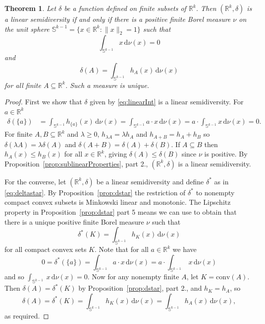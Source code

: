 \documentclass[11pt]{article}
\newtheorem{theorem}{Theorem}
\newcommand{\bbS}{\mathbb{S}}
\newcommand{\conv}{\mathrm{conv}}
\renewcommand{\Re}{\mathbb{R}}
\begin{document}
\begin{theorem}\label{thm:linear_characterize}
Let $\delta$ be a function defined on finite subsets of $\Re^k$. Then $(\Re^k,\delta)$ is a linear semidiversity if and only if there is a positive finite Borel measure $\nu$ on the unit sphere $\bbS^{k-1} = \{x \in \Re^k: \|x\|_2 = 1\}$  such that 
\begin{equation} \label{eq:centroid}
    \int_{\bbS^{k-1}} x \, \mathrm{d}\nu(x) = 0
\end{equation} 
and
\begin{equation} 
\delta(A) = \int_{\bbS^{k-1}} h_A(x) \, \mathrm{d}\nu(x) \label{eq:linearInt} \end{equation}
for all finite $A \subseteq \Re^k$. Such a measure is unique.
\end{theorem}
\begin{proof}
First we show that $\delta$ given by \eqref{eq:linearInt} is a linear semidiversity. For $a \in \Re^k$
\begin{align*}
\delta(\{a\}) & = \int_{\bbS^{k-1}} h_{\{a\}}(x) \, \mathrm{d}\nu(x) 
 = \int_{\bbS^{k-1}} a \cdot x \,  \mathrm{d}\nu(x) 
 = a \cdot \int_{\bbS^{k-1}}  x \, \mathrm{d}\nu(x) 
 = 0.
\end{align*}
For finite $A,B \subseteq \Re^k$ and $\lambda \geq 0$, $h_{\lambda A}=\lambda h_A$ and $h_{A+B} = h_A+h_B$ so $\delta(\lambda A)= \lambda \delta(A)$ and  $\delta(A+B) = \delta(A) + \delta(B)$. If $A \subseteq B$ then  $h_A(x) \leq h_B(x)$ for all $x \in \Re^k$, giving $\delta(A) \leq \delta(B)$ since $\nu$ is positive. By Proposition~\ref{prop:sublinearProperties}, part 2., 
$(\Re^k,\delta)$ is a linear semidiversity.

For the converse, let $(\Re^k,\delta)$ be a linear semidiversity and define $\delta^*$ as in \eqref{eq:deltastar}. 
By Proposition~\ref{prop:dstar} the restriction of $\delta^*$ to nonempty compact convex subsets is Minkowski linear and monotonic. 
The Lipschitz property in Proposition~\ref{prop:dstar} part 5 means we can use \cite[Thm.\ 1.2]{rotem2021riesz}
to obtain that
there is a unique positive finite Borel measure $\nu$ such that 
\[
\delta^*(K) = \int_{\bbS^{k-1}} h_K(x) \, \mathrm{d}\nu (x)
\]
for all compact convex sets $K$.
Note that for all $a \in \Re^k$ we have
\[
0= \delta^*(\{a\}) = \int_{\bbS^{k-1}} a \cdot x \, \mathrm{d}\nu (x) = a \cdot  \int_{\bbS^{k-1}}  \ x \, \mathrm{d}\nu (x)
\]
and so $\int_{\bbS^{k-1}}  \ x \, \mathrm{d}\nu (x)=0$.
 Now for any nonempty finite $A$, let $K = \conv(A)$. Then $\delta(A) = \delta^*(K)$ by Proposition~\ref{prop:dstar}, part 2., and $h_K = h_A$, so
\[\delta(A) = \delta^*(K) = \int_{\bbS^{k-1}} h_K(x) \, \mathrm{d}\nu (x) = \int_{\bbS^{k-1}} h_A(x) \, \mathrm{d}\nu(x), \]
as required.
\end{proof}
\end{document}
